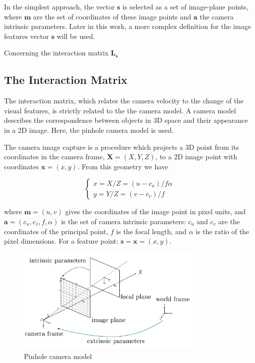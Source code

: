 In the simplest approach, the vector $\bm{s}$ is selected as a set of image-plane points, where $\bm{m}$ are the set of coordinates of these  image points and $\bm{a}$ the camera intrinsic parameters. Later in this work, a more complex definition for the image features vector $\bm{s}$ will be used.

Concerning the interaction matrix $\bm{L_s}$ 

\subsection*{The Interaction Matrix}

The interaction matrix, which relates the camera velocity to the change of the visual features, is strictly related to the the camera model. A camera model describes the correspondence between objects in 3D space and their appearance in a 2D image. Here, the pinhole camera model is used.

The camera image capture is a procedure which projects a 3D point from its coordinates in the camera frame, $\bm{X} = (X, Y, Z)$, to a 2D image point with coordinates $\bm{x} = (x, y)$. From this geometry we have

\begin{equation}
\begin{cases}
x = X/Z = (u - c_u) / f \alpha \\
y = Y/Z = (v - c_v) / f
\end{cases}
\label{eq:vs-th-6}
\end{equation}

where $\bm{m} = (u, v)$ gives the coordinates of the image point in pixel units, and $\bm{a} = (c_u, c_v, f, \alpha)$ is the set of camera intrinsic parameters: $c_u$ and $c_v$ are the coordinates of the principal point, $f$ is the focal length, and $\alpha$ is the ratio of the pixel dimensions. For a feature point: $\bm{s} = \bm{x} = (x, y)$.

\begin{figure}[ht]
	\centering
	\includegraphics[keepaspectratio, width=9cm]{content/chapter_02/images/pinhole_camera.png}
	\caption{Pinhole camera model}
	\label{fig:pin-hole}
\end{figure}

